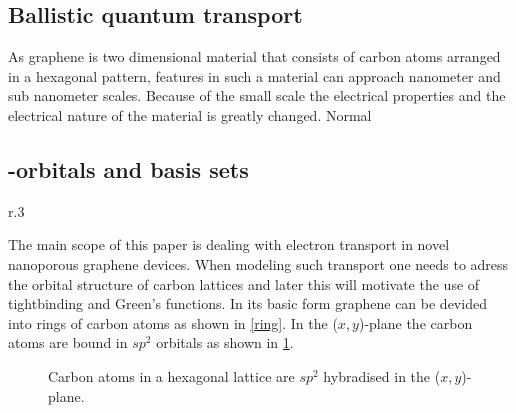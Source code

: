 \subsection{Ballistic quantum transport}
As graphene is two dimensional material that consists of carbon atoms arranged in a hexagonal pattern, features in such a material can approach nanometer and sub nanometer scales. Because of the small scale the electrical properties and the electrical nature of the material is greatly changed. Normal 
\subsection{\mathinhead{\pi}{\pi}-orbitals and basis sets}
\begin{wrapfigure}[7]{r}{.3\textwidth}
	\vspace{-2.3em}
	\centering
	\caption{Graphene lattices consists of hexagonal arrangements of carbon atoms.}\label{ring}
\end{wrapfigure}
The main scope of this paper is dealing with electron transport in novel nanoporous graphene devices.
When modeling such transport one needs to adress the orbital structure of carbon lattices and later this will motivate the use of tightbinding and Green's functions.
In its basic form graphene can be devided into rings of carbon atoms as shown in \cref{ring}. In the (\(x,y\))-plane the carbon atoms are bound in \(sp^2\) orbitals as shown in \cref{sp2}.
\begin{figure}[H]
  \centering
		\caption{Carbon atoms in a hexagonal lattice are \(sp^2\) hybradised in the (\(x,y\))-plane.}\label{sp2}
\end{figure}
